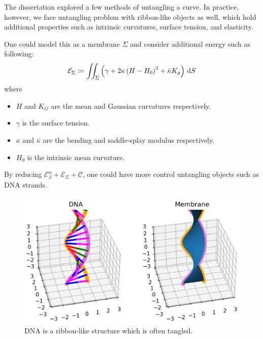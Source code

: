 \documentclass[../dissertation.tex]{subfiles}
\begin{document}
The dissertation explored a few methods of untangling a curve.
In practice, however, we face untangling problem with ribbon-like objects as well,
which hold additional properties such as intrinsic curvatures, surface tension, and elasticity.

One could model this as a membrane $\Sigma$ and consider additional energy such as following\cite{mmb}:
\begin{equation}
    \mathcal{E}_{\Sigma} \coloneqq \iint_{\Sigma} \left( \gamma + 2 \kappa \left( H-H_0 \right)^2 + \bar \kappa K_g \right) \, \text{d} S
\end{equation}
where
\begin{itemize}
    \item $H$ and $K_G$ are the mean and Gaussian curvatures respectively.
    \item $\gamma$ is the surface tension.
    \item $\kappa$ and $\bar \kappa$ are the bending and saddle-splay modulus respectively.
    \item $H_0$ is the intrinsic mean curvature.
\end{itemize}
By reducing $\mathcal{E}_{\beta}^{\alpha} + \mathcal{E}_{\Sigma} + \mathcal{C}$, one could have more control untangling objects such as DNA strands.

\begin{figure}[tbp]
    \centering
    \includegraphics[scale=0.7]{sections/MembraneImgs/dnaMembrane}
    \caption{DNA is a ribbon-like structure which is often tangled.}
\end{figure}
\end{document}
